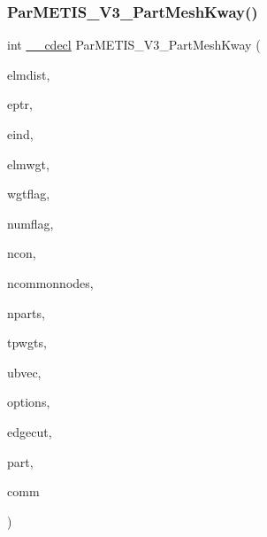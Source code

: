 \subsubsection{\texorpdfstring{Par\+M\+E\+T\+I\+S\+\_\+\+V3\+\_\+\+Part\+Mesh\+Kway()}{ParMETIS\_V3\_PartMeshKway()}}
{\footnotesize\ttfamily int \hyperlink{include_2parmetis_8h_a238347d7669f8f1e9c83bfe63a2730c4}{\+\_\+\+\_\+cdecl} Par\+M\+E\+T\+I\+S\+\_\+\+V3\+\_\+\+Part\+Mesh\+Kway (\begin{DoxyParamCaption}\item[{\hyperlink{3rd_party_2parmetis-4_80_83_2metis_2include_2metis_8h_aaa5262be3e700770163401acb0150f52}{idx\+\_\+t} $\ast$}]{elmdist,  }\item[{\hyperlink{3rd_party_2parmetis-4_80_83_2metis_2include_2metis_8h_aaa5262be3e700770163401acb0150f52}{idx\+\_\+t} $\ast$}]{eptr,  }\item[{\hyperlink{3rd_party_2parmetis-4_80_83_2metis_2include_2metis_8h_aaa5262be3e700770163401acb0150f52}{idx\+\_\+t} $\ast$}]{eind,  }\item[{\hyperlink{3rd_party_2parmetis-4_80_83_2metis_2include_2metis_8h_aaa5262be3e700770163401acb0150f52}{idx\+\_\+t} $\ast$}]{elmwgt,  }\item[{\hyperlink{3rd_party_2parmetis-4_80_83_2metis_2include_2metis_8h_aaa5262be3e700770163401acb0150f52}{idx\+\_\+t} $\ast$}]{wgtflag,  }\item[{\hyperlink{3rd_party_2parmetis-4_80_83_2metis_2include_2metis_8h_aaa5262be3e700770163401acb0150f52}{idx\+\_\+t} $\ast$}]{numflag,  }\item[{\hyperlink{3rd_party_2parmetis-4_80_83_2metis_2include_2metis_8h_aaa5262be3e700770163401acb0150f52}{idx\+\_\+t} $\ast$}]{ncon,  }\item[{\hyperlink{3rd_party_2parmetis-4_80_83_2metis_2include_2metis_8h_aaa5262be3e700770163401acb0150f52}{idx\+\_\+t} $\ast$}]{ncommonnodes,  }\item[{\hyperlink{3rd_party_2parmetis-4_80_83_2metis_2include_2metis_8h_aaa5262be3e700770163401acb0150f52}{idx\+\_\+t} $\ast$}]{nparts,  }\item[{\hyperlink{3rd_party_2parmetis-4_80_83_2metis_2include_2metis_8h_a1924a4f6907cc3833213aba1f07fcbe9}{real\+\_\+t} $\ast$}]{tpwgts,  }\item[{\hyperlink{3rd_party_2parmetis-4_80_83_2metis_2include_2metis_8h_a1924a4f6907cc3833213aba1f07fcbe9}{real\+\_\+t} $\ast$}]{ubvec,  }\item[{\hyperlink{3rd_party_2parmetis-4_80_83_2metis_2include_2metis_8h_aaa5262be3e700770163401acb0150f52}{idx\+\_\+t} $\ast$}]{options,  }\item[{\hyperlink{3rd_party_2parmetis-4_80_83_2metis_2include_2metis_8h_aaa5262be3e700770163401acb0150f52}{idx\+\_\+t} $\ast$}]{edgecut,  }\item[{\hyperlink{3rd_party_2parmetis-4_80_83_2metis_2include_2metis_8h_aaa5262be3e700770163401acb0150f52}{idx\+\_\+t} $\ast$}]{part,  }\item[{M\+P\+I\+\_\+\+Comm $\ast$}]{comm }\end{DoxyParamCaption})}

